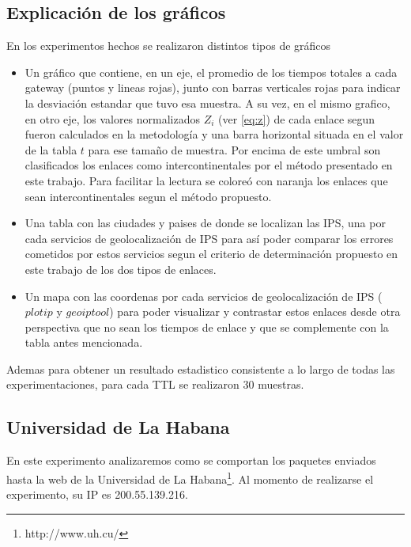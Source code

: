 \subsection{Explicación de los gráficos}

En los experimentos hechos se realizaron distintos tipos de gráficos

\begin{itemize}
	\item Un gráfico que contiene, en un eje, el promedio de los tiempos totales
	a cada gateway (puntos y lineas rojas), junto con barras verticales rojas
	para indicar la desviación estandar que tuvo esa muestra. A su vez, en el
	mismo grafico, en otro eje, los valores normalizados $Z_{i}$ (ver
	\ref{eq:z}) de cada enlace segun fueron calculados en la metodología y una
	barra horizontal situada en el valor de la tabla $t$ para ese tamaño de
	muestra.  Por encima de este umbral son clasificados los enlaces como
	intercontinentales por el método presentado en este trabajo.  Para
	facilitar la lectura se coloreó con naranja los enlaces que sean
	intercontinentales segun el método propuesto.

	\item Una tabla con las ciudades y paises de donde se localizan las IPS,
	una por cada servicios de geolocalización de IPS para así poder comparar
	los errores cometidos por estos servicios segun el criterio de
	determinación propuesto en este trabajo de los dos tipos de enlaces.

	\item Un mapa con las coordenas por cada servicios de geolocalización de
	IPS ($plotip$ y $geoiptool$) para poder visualizar y contrastar estos
	enlaces desde otra perspectiva que no sean los tiempos de enlace y que
	se complemente con la tabla antes mencionada.
\end{itemize}

Ademas para obtener un resultado estadistico consistente a lo largo de todas las
experimentaciones, para cada TTL se realizaron 30 muestras.

\clearpage

\subsection{Universidad de La Habana}

En este experimento analizaremos como se comportan los paquetes enviados hasta
la web de la Universidad de La Habana\footnote{http://www.uh.cu/}. Al momento
de realizarse el experimento, su IP es 200.55.139.216.

